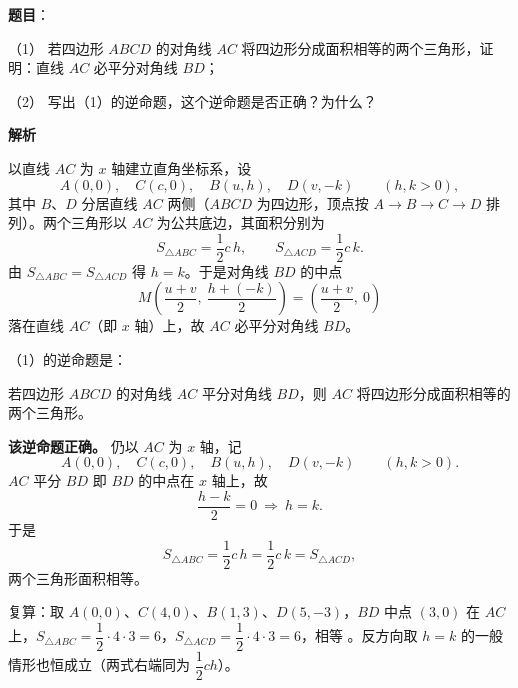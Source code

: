 \begin{answer}

\textbf{题目}：

（1） 若四边形 $ABCD$ 的对角线 $AC$ 将四边形分成面积相等的两个三角形，证明：直线 $AC$ 必平分对角线 $BD$；

（2） 写出（1）的逆命题，这个逆命题是否正确？为什么？

\textbf{解析}


以直线 $AC$ 为 $x$ 轴建立直角坐标系，设
\nopagebreak[4]
\[
A(0,0),\quad C(c,0),\quad B(u,h),\quad D(v,-k)\qquad(h,k>0),
\]
其中 $B$、$D$ 分居直线 $AC$ 两侧（$ABCD$ 为四边形，顶点按 $A\to B\to C\to D$ 排列）。两个三角形以 $AC$ 为公共底边，其面积分别为
\nopagebreak[4]
\[
S_{\triangle ABC}=\frac12 c\,h,\qquad S_{\triangle ACD}=\frac12 c\,k.
\]
由 $S_{\triangle ABC}=S_{\triangle ACD}$ 得 $h=k$。于是对角线 $BD$ 的中点
\nopagebreak[4]
\[
M\left(\frac{u+v}{2},\ \frac{h+(-k)}{2}\right)=\left(\frac{u+v}{2},\ 0\right)
\]
落在直线 $AC$（即 $x$ 轴）上，故 $AC$ 必平分对角线 $BD$。


（1）的逆命题是：

\begin{gktip}
若四边形 $ABCD$ 的对角线 $AC$ 平分对角线 $BD$，则 $AC$ 将四边形分成面积相等的两个三角形。
\end{gktip}

\textbf{该逆命题正确。} 仍以 $AC$ 为 $x$ 轴，记
\nopagebreak[4]
\[
A(0,0),\quad C(c,0),\quad B(u,h),\quad D(v,-k)\qquad(h,k>0).
\]
$AC$ 平分 $BD$ 即 $BD$ 的中点在 $x$ 轴上，故
\nopagebreak[4]
\[
\frac{h-k}{2}=0\ \Longrightarrow\ h=k.
\]
于是
\nopagebreak[4]
\[
S_{\triangle ABC}=\frac12 c\,h=\frac12 c\,k=S_{\triangle ACD},
\]
两个三角形面积相等。

复算：取 $A(0,0)$、$C(4,0)$、$B(1,3)$、$D(5,-3)$，$BD$ 中点 $(3,0)$ 在 $AC$ 上，$S_{\triangle ABC}=\dfrac12\cdot4\cdot3=6$，$S_{\triangle ACD}=\dfrac12\cdot4\cdot3=6$，相等 。反方向取 $h=k$ 的一般情形也恒成立（两式右端同为 $\dfrac12ch$）。



\end{answer}
